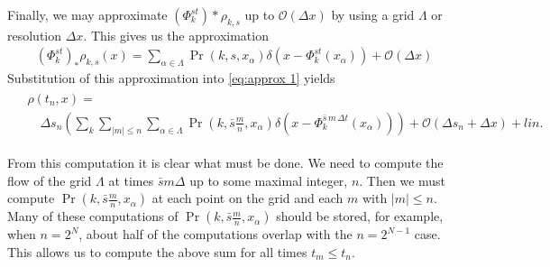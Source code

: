 \documentclass[12pt]{amsart}
\begin{document}
Finally, we may approximate $(\Phi_k^{st})*\rho_{k,s}$ up to $\mathcal{O}( \Delta x)$ by using a grid $\Lambda$ or resolution $\Delta x$.
This gives us the approximation
\begin{align*}
	(\Phi_k^{st})_* \rho_{k,s}(x) = \sum_{\alpha \in \Lambda } \Pr( k , s , x_\alpha) \delta( x - \Phi_k^{st} (x_\alpha) ) + \mathcal{O}( \Delta x )
\end{align*}
Substitution of this approximation into \eqref{eq:approx 1} yields 
\begin{align}
\begin{split}
	&\rho(t_n , x) = \\
	&\quad \Delta s_n \left( \sum_{k} \sum_{ |m| \leq n }  \sum_{\alpha \in \Lambda } \Pr( k , \bar{s}\frac{m}{n} , x_\alpha) \delta( x - \Phi_k^{\bar{s}\, m \, \Delta t} (x_\alpha) ) \right) +\mathcal{O}( \Delta s_n + \Delta x) + lin. \label{eq:approx 2}
\end{split}
\end{align}

From this computation it is clear what must be done.
We need to compute the flow of the grid $\Lambda$ at times $\bar{s} m \Delta$ up to some maximal integer, $n$.
Then we must compute $\Pr( k , \bar{s}\frac{m}{n} , x_\alpha)$ at each point on the grid and each $m$ with $|m| \leq n$.
Many of these computations of $\Pr(k,\bar{s} \frac{m}{n}, x_\alpha)$ should be stored, for example, when $n=2^{N}$, about half of the computations overlap with the $n=2^{N-1}$ case.
This allows us to compute the above sum for all times $t_m \leq t_n$.
\end{document}
